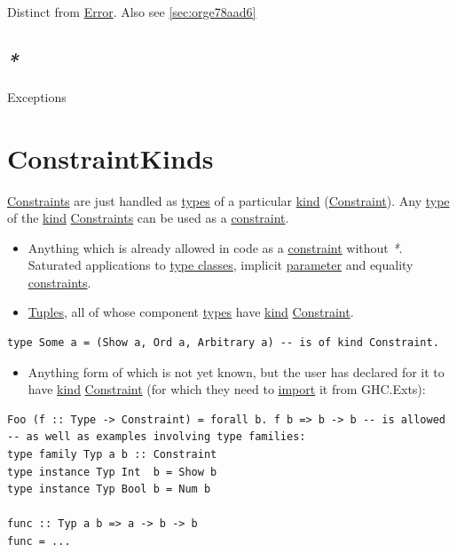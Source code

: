 \documentclass[a4paper,14pt,oneside]{book}
\begin{document}
Distinct from \hyperref[org345bf3b]{Error}. Also see \ref{sec:orge78aad6}

\section{\emph{*}}
\label{sec:orge5c59f4}

\label{org933b6f3}Exceptions

\chapter{\label{org0de416e}ConstraintKinds}
\label{sec:orgf1858f4}
\hyperref[org35cb247]{Constraints} are just handled as \hyperref[org85a0bc6]{types} of a particular \hyperref[org3495e40]{kind} (\hyperref[org0cfdff2]{Constraint}).
Any \hyperref[org37456cb]{type} of the \hyperref[org3495e40]{kind} \hyperref[org35cb247]{Constraints} can be used as a \hyperref[org0cfdff2]{constraint}.
\begin{itemize}
\item Anything which is already allowed in code as a \hyperref[org0cfdff2]{constraint} without \emph{*}. Saturated applications to \hyperref[org1459485]{type classes}, implicit \hyperref[org64dcfd4]{parameter} and equality \hyperref[org35cb247]{constraints}.
\item \hyperref[org6fe69b8]{Tuples}, all of whose component \hyperref[org85a0bc6]{types} have \hyperref[org3495e40]{kind} \hyperref[org0cfdff2]{Constraint}.
\end{itemize}
\begin{verbatim}
type Some a = (Show a, Ord a, Arbitrary a) -- is of kind Constraint.
\end{verbatim}
\begin{itemize}
\item Anything form of which is not yet known, but the user has declared for it to have \hyperref[org3495e40]{kind} \hyperref[org0cfdff2]{Constraint} (for which they need to \hyperref[orgf20c896]{import} it from GHC.Exts):
\end{itemize}
\begin{verbatim}
Foo (f :: Type -> Constraint) = forall b. f b => b -> b -- is allowed
-- as well as examples involving type families:
type family Typ a b :: Constraint
type instance Typ Int  b = Show b
type instance Typ Bool b = Num b

func :: Typ a b => a -> b -> b
func = ...
\end{verbatim}
\end{document}
